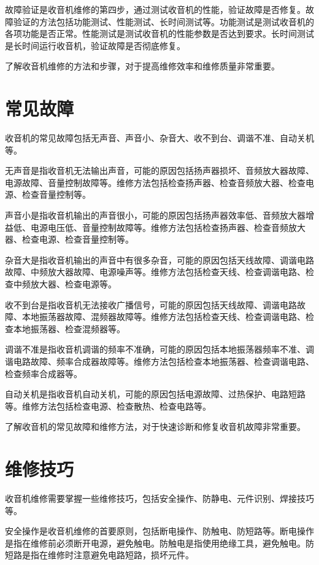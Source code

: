 \documentclass[12pt,UTF8]{ctexbook}
\begin{document}
故障验证是收音机维修的第四步，通过测试收音机的性能，验证故障是否修复。故障验证的方法包括功能测试、性能测试、长时间测试等。功能测试是测试收音机的各项功能是否正常。性能测试是测试收音机的性能参数是否达到要求。长时间测试是长时间运行收音机，验证故障是否彻底修复。

了解收音机维修的方法和步骤，对于提高维修效率和维修质量非常重要。

\section{常见故障}

收音机的常见故障包括无声音、声音小、杂音大、收不到台、调谐不准、自动关机等。

无声音是指收音机无法输出声音，可能的原因包括扬声器损坏、音频放大器故障、电源故障、音量控制故障等。维修方法包括检查扬声器、检查音频放大器、检查电源、检查音量控制等。

声音小是指收音机输出的声音很小，可能的原因包括扬声器效率低、音频放大器增益低、电源电压低、音量控制故障等。维修方法包括检查扬声器、检查音频放大器、检查电源、检查音量控制等。

杂音大是指收音机输出的声音中有很多杂音，可能的原因包括天线故障、调谐电路故障、中频放大器故障、电源噪声等。维修方法包括检查天线、检查调谐电路、检查中频放大器、检查电源等。

收不到台是指收音机无法接收广播信号，可能的原因包括天线故障、调谐电路故障、本地振荡器故障、混频器故障等。维修方法包括检查天线、检查调谐电路、检查本地振荡器、检查混频器等。

调谐不准是指收音机调谐的频率不准确，可能的原因包括本地振荡器频率不准、调谐电路故障、频率合成器故障等。维修方法包括检查本地振荡器、检查调谐电路、检查频率合成器等。

自动关机是指收音机自动关机，可能的原因包括电源故障、过热保护、电路短路等。维修方法包括检查电源、检查散热、检查电路等。

了解收音机的常见故障和维修方法，对于快速诊断和修复收音机故障非常重要。

\section{维修技巧}

收音机维修需要掌握一些维修技巧，包括安全操作、防静电、元件识别、焊接技巧等。

安全操作是收音机维修的首要原则，包括断电操作、防触电、防短路等。断电操作是指在维修前必须断开电源，避免触电。防触电是指使用绝缘工具，避免触电。防短路是指在维修时注意避免电路短路，损坏元件。
\end{document}
